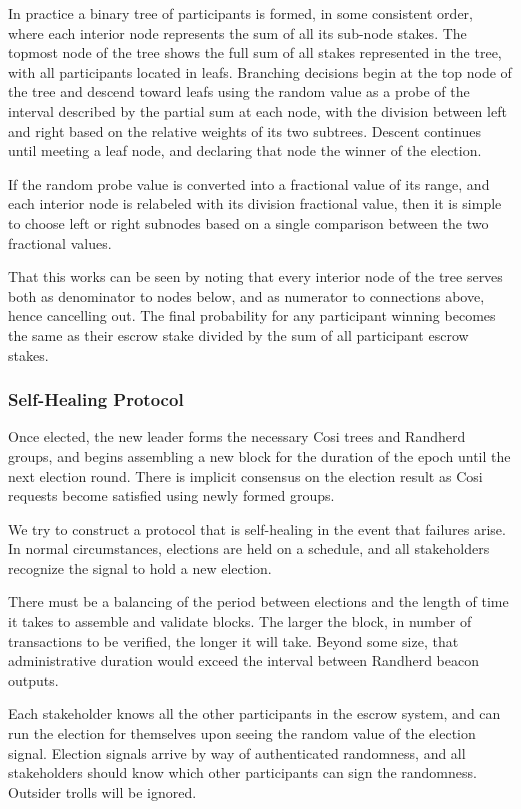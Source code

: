 \documentclass{yellowpaper}
\begin{document}
In practice a binary tree of participants is formed, in some consistent order, where each interior node represents the sum of all its sub-node stakes. The topmost node of the tree shows the full sum of all stakes represented in the tree, with all participants located in leafs. Branching decisions begin at the top node of the tree and descend toward leafs using the random value as a probe of the interval described by the partial sum at each node, with the division between left and right based on the relative weights of its two subtrees. Descent continues until meeting a leaf node, and declaring that node the winner of the election. 

If the random probe value is converted into a fractional value of its range, and each interior node is relabeled with its division fractional value, then it is simple to choose left or right subnodes based on a single comparison between the two fractional values.

That this works can be seen by noting that every interior node of the tree serves both as denominator to nodes below, and as numerator to connections above, hence cancelling out. The final probability for any participant winning becomes the same as their escrow stake divided by the sum of all participant escrow stakes.

\subsubsection{Self-Healing Protocol}
Once elected, the new leader forms the necessary Cosi trees and Randherd groups, and begins assembling a new block for the duration of the epoch until the next election round. There is implicit consensus on the election result as Cosi requests become satisfied using newly formed groups.

We try to construct a protocol that is self-healing in the event that failures arise. In normal circumstances, elections are held on a schedule, and all stakeholders recognize the signal to hold a new election. 

There must be a balancing of the period between elections and the length of time it takes to assemble and validate blocks. The larger the block, in number of transactions to be verified, the longer it will take. Beyond some size, that administrative duration would exceed the interval between Randherd beacon outputs.

Each stakeholder knows all the other participants in the escrow system, and can run the election for themselves upon seeing the random value of the election signal. Election signals arrive by way of authenticated randomness, and all stakeholders should know which other participants can sign the randomness. Outsider trolls will be ignored.
\end{document}
